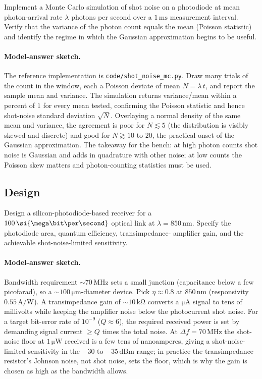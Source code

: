 \begin{exercise}
Implement a Monte Carlo simulation of shot noise on a photodiode at
mean photon-arrival rate $\lambda$ photons per second over a $1\,\si{
\milli\second}$ measurement interval. Verify that the variance of
the photon count equals the mean (Poisson statistic) and identify
the regime in which the Gaussian approximation begins to be useful.
\paragraph{Model-answer sketch.} The reference implementation is
\texttt{code/shot\_noise\_mc.py}. Draw many trials of the count in the
window, each a Poisson deviate of mean $N = \lambda\,t$, and report the
sample mean and variance. The simulation returns variance/mean within a
percent of $1$ for every mean tested, confirming the Poisson statistic
and hence shot-noise standard deviation $\sqrt{N}$. Overlaying a normal
density of the same mean and variance, the agreement is poor for
$N \lesssim 5$ (the distribution is visibly skewed and discrete) and
good for $N \gtrsim 10$ to $20$, the practical onset of the Gaussian
approximation. The takeaway for the bench: at high photon counts shot
noise is Gaussian and adds in quadrature with other noise; at low counts
the Poisson skew matters and photon-counting statistics must be used.
\end{exercise}

\subsection*{Design}

\begin{exercise}
Design a silicon-photodiode-based receiver for a $100\,\si{\mega
\bit\per\second}$ optical link at $\lambda = 850\,\si{\nano\meter}$.
Specify the photodiode area, quantum efficiency, transimpedance-
amplifier gain, and the achievable shot-noise-limited sensitivity.
\paragraph{Model-answer sketch.} Bandwidth requirement $\sim 70\,\si{
\mega\hertz}$ sets a small junction (capacitance below a few picofarad),
so a $\sim 100\,\si{\micro\meter}$-diameter device. Pick $\eta \approx
0.8$ at $850\,\si{\nano\meter}$ (responsivity $0.55\,\si{\ampere\per
\watt}$). A transimpedance gain of $\sim 10\,\si{\kilo\ohm}$ converts a
$\si{\micro\ampere}$ signal to tens of millivolts while keeping the
amplifier noise below the photocurrent shot noise. For a target
bit-error rate of $10^{-9}$ ($Q \approx 6$), the required received
power is set by demanding signal current $\geq Q$ times the total noise.
At $\Delta f = 70\,\si{\mega\hertz}$ the shot-noise floor at $1\,\si{
\micro\watt}$ received is a few tens of nanoamperes, giving a
shot-noise-limited sensitivity in the $-30$ to $-35\,\text{dBm}$
range; in practice the transimpedance resistor's Johnson noise,
not shot noise, sets the floor, which is why the gain is chosen as high
as the bandwidth allows.
\end{exercise}

